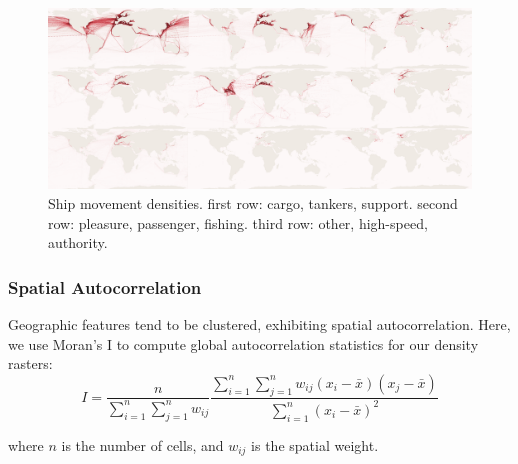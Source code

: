 \begin{figure}[htbp]
  \centerline{\includegraphics[width=220mm]{figures/9fold-map-black-test_cropped_inverted_thesis.png}}
  \caption{Ship movement densities. first row: cargo, tankers, support. second row:  pleasure, passenger, fishing. third row: other, high-speed, authority.}
  \label{fig:9fold-ship-maps}
\end{figure}


\subsubsection{Spatial Autocorrelation}

Geographic features tend to be clustered, exhibiting spatial autocorrelation. Here, we use Moran's I to compute global autocorrelation statistics for our density rasters:
\begin{equation}
I = \frac{n}{\sum_{i=1}^{n}\sum_{j=1}^{n}w_{ij}}
\frac{\sum_{i=1}^{n}\sum_{j=1}^{n}w_{ij}(x_i-\bar{x})(x_j-\bar{x})}{\sum_{i=1}^{n}(x_i - \bar{x})^2}
\end{equation}

where $n$ is the number of cells, and $w_{ij}$ is the spatial weight.

